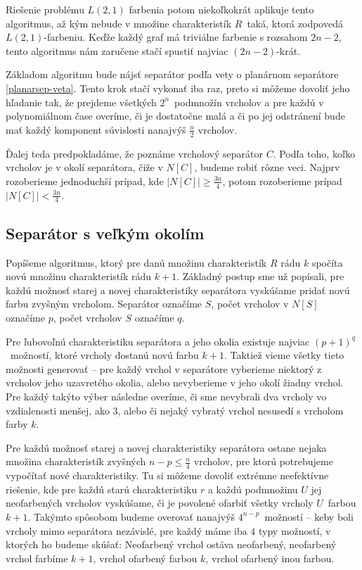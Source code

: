 Riešenie
problému $L(2,1)$ farbenia potom niekoľkokrát aplikuje tento algoritmus, až kým nebude v množine
charakteristík $R$ taká, ktorá zodpovedá $L(2,1)$-farbeniu. Keďže každý graf má triviálne farbenie
s rozsahom $2n - 2$, tento algoritmus nám zaručene stačí spustiť najviac $(2n - 2)$-krát.

Základom algoritmu bude nájsť separátor podľa vety o planárnom separátore \ref{planarsep-veta}. Tento
krok stačí vykonať iba raz, preto si môžeme dovoliť jeho hľadanie tak, že prejdeme všetkých $2^n$ podmnožín
vrcholov a pre každú v polynomiálnom čase overíme, či je dostatočne malá a či po jej odstránení bude mať
každý komponent súvislosti nanajvýš $\frac{n}{2}$ vrcholov.

Ďalej teda predpokladáme, že poznáme vrcholový separátor $C$. Podľa toho, koľko vrcholov je v okolí separátora, čiže
v $N[C]$, budeme robiť rôzne veci. Najprv rozoberieme jednoduchší prípad, kde $|N[C]| \ge \frac{3n}{4}$,
potom rozoberieme prípad $|N[C]| < \frac{3n}{4}$.

\subsection{Separátor s veľkým okolím}

Popíšeme algoritmus, ktorý pre danú množinu charakteristík $R$ rádu $k$ spočíta novú množinu charakteristík
rádu $k+1$. Základný postup sme už popísali, pre každú možnosť starej a novej charakteristiky separátora
vyskúšame pridať novú farbu zvyšným vrcholom. Separátor označíme $S$, počet vrcholov v $N[S]$ označíme $p$, počet
vrcholov $S$ označíme $q$.

Pre ľubovoľnú charakteristiku separátora a jeho okolia existuje najviac $(p+1)^q$ možností, ktoré
vrcholy dostanú novú farbu $k+1$. Taktiež vieme všetky tieto možnosti generovať -- pre každý vrchol v separátore
vyberieme niektorý z vrcholov jeho uzavretého okolia, alebo nevyberieme v jeho okolí žiadny vrchol. Pre
každý takýto výber následne overíme, či sme nevybrali dva vrcholy vo vzdialenosti menšej, ako $3$, alebo
či nejaký vybratý vrchol nesusedí s vrcholom farby $k$.

Pre každú možnosť starej a novej charakteristiky separátora ostane nejaka množina charakteristík
zvyšných $n-p \leq \frac{n}{4}$ vrcholov, pre ktorú potrebujeme vypočítať nové charakteristiky. Tu si môžeme
dovoliť extrémne neefektívne riešenie, kde pre každú starú charakteristiku $r$ a každú podmnožinu $U$
jej neofarbených vrcholov vyskúšame, či je povolené ofarbiť všetky vrcholy $U$ farbou $k+1$. Takýmto
spôsobom budeme overovať nanajvýš $4^{n-p}$ možností -- keby boli vrcholy mimo separátora nezávislé,
pre každý máme iba $4$ typy možností, v ktorých ho budeme skúšať: Neofarbený vrchol ostáva neofarbený,
neofarbený vrchol farbíme $k+1$, vrchol ofarbený farbou $k$, vrchol ofarbený inou farbou.

